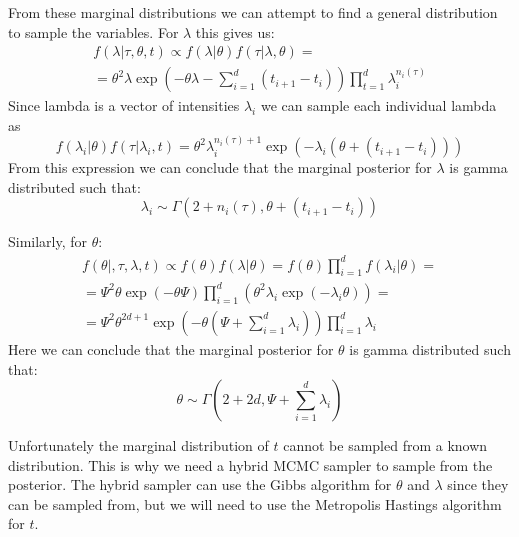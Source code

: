 \documentclass[a4paper]{article}
\begin{document}
From these marginal distributions we can attempt to find a general distribution to sample the variables. For $\lambda$ this gives us:
\begin{equation}
    \begin{gathered}
        f(\lambda | \tau, \theta, t) \propto f(\lambda|\theta)f(\tau|\lambda,\theta) = \\ = \theta^2\lambda\exp(-\theta\lambda-\sum_{i=1}^d(t_{i+1}-t_i))\prod_{t=1}^d\lambda_i^{n_i(\tau)}
    \end{gathered}
\end{equation}
Since lambda is a vector of intensities $\lambda_i$ we can sample each individual lambda as 
\begin{equation}
    f(\lambda_i|\theta)f(\tau|\lambda_i,t) = \theta^2\lambda_i^{n_i(\tau)+1}\exp(-\lambda_i(\theta + (t_{i+1}-t_i)))
\end{equation}
From this expression we can conclude that the marginal posterior for $\lambda$ is gamma distributed such that:
\begin{equation}
    \lambda_i \sim \Gamma(2+n_i(\tau), \theta + (t_{i+1} - t_i))
\end{equation}

Similarly, for $\theta$:
\begin{equation}
    \begin{gathered}
        f(\theta|, \tau, \lambda, t) \propto f(\theta)f(\lambda|\theta) = f(\theta)\prod_{i=1}^d f(\lambda_i|\theta)= \\
        = \Psi^2\theta\exp(-\theta\Psi)\prod_{i=1}^d(\theta^2\lambda_i\exp(-\lambda_i\theta)) = \\
        = \Psi^2\theta^{2d+1}\exp(-\theta(\Psi+\sum_{i=1}^d\lambda_i))\prod_{i=1}^d\lambda_i
    \end{gathered}
\end{equation}
Here we can conclude that the marginal posterior for $\theta$ is gamma distributed such that:
\begin{equation}
    \theta \sim \Gamma(2+2d, \Psi+\sum_{i=1}^d\lambda_i)
\end{equation}

Unfortunately the marginal distribution of $t$ cannot be sampled from a known distribution. This is why we need a hybrid MCMC sampler to sample from the posterior. The hybrid sampler can use the Gibbs algorithm for $\theta$ and $\lambda$ since they can be sampled from, but we will need to use the Metropolis Hastings algorithm for $t$.
\end{document}
